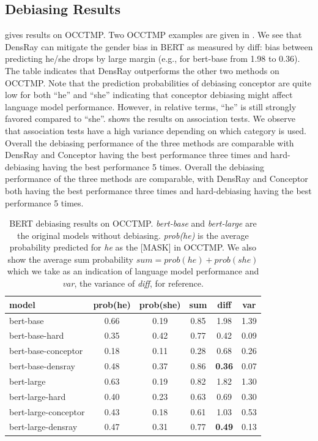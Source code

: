 
\subsection{Debiasing Results}
 gives results on OCCTMP. Two OCCTMP
examples are given in . We see that
DensRay can mitigate the gender bias in BERT as measured by
diff: bias between predicting he/she drops by large margin
(e.g., for bert-base from 1.98 to 0.36). The table indicates
that DensRay outperforms the other two methods on OCCTMP.
Note that
the prediction probabilities of debiasing conceptor are
quite low for both ``he'' and ``she'' indicating that conceptor debiasing might affect language model performance. However,
in relative terms, ``he'' is still strongly favored compared
to ``she''.
 shows the results on association tests. We observe that association tests have a high variance depending on which category is used. 
Overall the debiasing performance of the three methods are comparable with DensRay and Conceptor having the best performance three times and hard-debiasing having the best performance 5 times.
Overall the debiasing performance of the three methods are comparable, with DensRay and Conceptor both having the best performance three times and hard-debiasing having the best performance 5 times.

\begin{table}[ht]
\centering
\footnotesize
\vspace{0cm}  
\setlength{\abovecaptionskip}{0.2cm}   
\setlength{\belowcaptionskip}{0cm}
\begin{tabular}{lccccc}
\hline
model & prob(he) & prob(she) & sum &diff & var\\
\hline
bert-base & 0.66 & 0.19 & 0.85 &1.98&1.39\\
bert-base-hard & 0.35 & 0.42 & 0.77&0.42&0.09\\
bert-base-conceptor & 0.18 & 0.11 & 0.28 & 0.68&0.26\\
bert-base-densray & 0.48 & 0.37 & 0.86&\textbf{0.36}&0.07\\
\hline
bert-large  & 0.63 & 0.19 & 0.82  &1.82&1.30\\
bert-large-hard & 0.40 & 0.23 & 0.63&0.69&0.30\\
bert-large-conceptor & 0.43 & 0.18 & 0.61 & 1.03&0.53\\
bert-large-densray  & 0.47 & 0.31 & 0.77&\textbf{0.49}&0.13 \\
\hline
\end{tabular}
\caption{ BERT debiasing results on OCCTMP. \textit{bert-base} and \textit{bert-large} are the original models without debiasing. \textit{prob(he)} is
	the average probability predicted for \textit{he} as the [MASK] in OCCTMP. We also show the average sum probability $sum=prob(he)+prob(she)$ which we take as an indication of 
	language model performance and \textit{var}, the variance of \textit{ diff}, for reference.}
\end{table}

